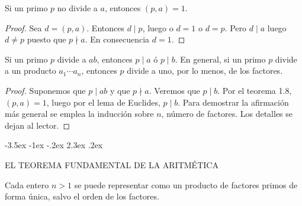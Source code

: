 \documentclass[12pt,a4paper]{book}
\makeatletter
\renewcommand\section{\@startsection{section}{1}{\z@}%
  {-3.5ex \@plus -1ex \@minus -.2ex}%
  {2.3ex \@plus .2ex}%
  {\normalfont\Large\bfseries\raggedright}}
\makeatother
\begin{document}
    \begin{teorema}
        Si un primo $p$ no divide a $a$, entonces $(p,a)=1$.
    \end{teorema}

    \begin{proof}
        Sea $d=(p,a)$. Entonces $d\mid p$, luego o $d=1$ o $d=p$. Pero $d\mid a$ luego
        $d\neq p$ puesto que $p\nmid a$. En consecuencia $d=1$.
    \end{proof}

    \begin{teorema}
        Si un primo $p$ divide a $ab$, entonces $p\mid a$ ó $p\mid b$. En general, si un
        primo $p$ divide a un producto $a_{1}\cdots a_{n}$, entonces $p$ divide a uno, por lo
        menos, de los factores.
    \end{teorema}

    \begin{proof}
        Suponemos que $p\mid ab$ y que $p\nmid a$. Veremos que $p\mid b$. Por el teorema 1.8,
        $(p,a)=1$, luego por el lema de Euclides, $p\mid b$. Para demostrar la afirmación más
        general se emplea la inducción sobre $n$, número de factores. Los detalles se dejan
        al lector.
    \end{proof}

    \section{EL TEOREMA FUNDAMENTAL DE LA ARITMÉTICA}
    \begin{teorema}
        Cada entero $n>1$ se puede representar como un producto de factores primos de forma
        única, salvo el orden de los factores.
    \end{teorema}
\end{document}
